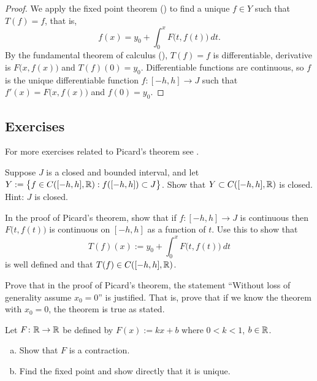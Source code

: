 \begin{proof}
We apply the fixed point theorem ()
to find a unique $f \in Y$ such that $T(f) = f$, that is,
\begin{equation*} %
f(x) = y_0 + \int_0^x F\bigl(t,f(t)\bigr)~dt .
\end{equation*}
By the fundamental theorem of calculus (),
$T(f) = f$ is differentiable, derivative is
$F\bigl(x,f(x)\bigr)$ and $T(f)(0) = y_0$.
Differentiable functions are continuous, so
$f$ is the unique differentiable function $f \colon [-h,h] \to J$
such that
 $f'(x) = F\bigl(x,f(x)\bigr)$ and $f(0) = y_0$.
\end{proof}

\subsection{Exercises}

\begin{exnote}
For more exercises related to Picard's theorem see .
\end{exnote}

\begin{exercise}
Suppose $J$ is a closed and bounded interval, and let
$Y := \bigl\{ f \in C([-h,h],{\mathbb{R}}) : f([-h,h]) \subset J \bigr\}$.
Show that $Y \subset C([-h,h],{\mathbb{R}})$ is closed.  Hint: $J$ is closed.
\end{exercise}

\begin{exercise}
In the proof of Picard's theorem,
show that if $f \colon [-h,h] \to J$ is continuous then $F\bigl(t,f(t)\bigr)$
is continuous on $[-h,h]$ as a function of $t$.  Use this to show that
\begin{equation*}
T(f)(x)
:=
y_0 + \int_0^x F\bigl(t,f(t)\bigr)~dt
\end{equation*}
is well defined and that $T(f) \in C([-h,h],{\mathbb{R}})$.
\end{exercise}


\begin{exercise}
Prove that in the proof of Picard's theorem,
the statement ``Without loss of generality assume $x_0 = 0$'' is
justified.  That is, prove that if we know the theorem with $x_0 = 0$, the
theorem is true as stated.
\end{exercise}


\begin{exercise}
Let $F \colon {\mathbb{R}} \to {\mathbb{R}}$ be defined by
$F(x) := kx + b$ where $0 < k < 1$, $b \in {\mathbb{R}}$.
\begin{enumerate}[a)]
\item
Show that $F$ is a contraction.
\item
Find the fixed point and show directly that it is unique.
\end{enumerate}
\end{exercise}

